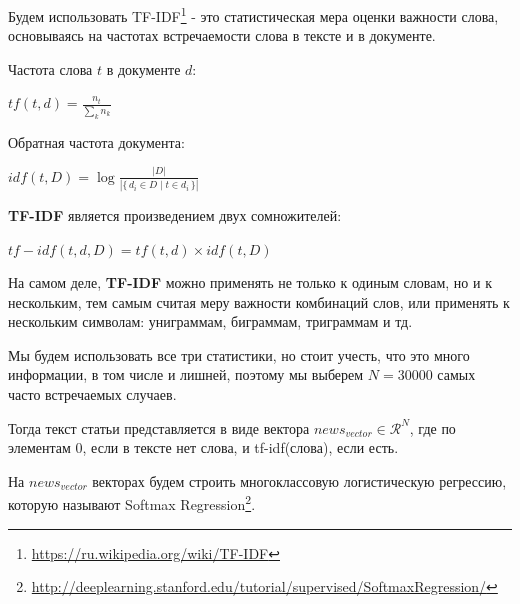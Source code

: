 \documentclass[12pt]{article}
\begin{document}
            
            Будем использовать TF-IDF\footnote{\href{https://ru.wikipedia.org/wiki/TF-IDF}{https://ru.wikipedia.org/wiki/TF-IDF}}
            - это статистическая мера оценки важности слова, основываясь на частотах встречаемости слова в тексте и в документе.

            Частота слова $t$ в документе $d$: 
            \begin{center}
                ${{tf} (t,d)={\frac {n_{t}}{\sum _{k}n_{k}}}}$
            \end{center}
            
            Обратная частота документа:
            \begin{center}
                ${idf} (t,D)=\log {\frac {|D|}{|\{\,d_{i}\in D\mid t\in d_{i}\,\}|}}$
            \end{center}

            \textbf{TF-IDF} является произведением двух сомножителей: 
            \begin{center}
                ${tf-idf}(t,d,D) = {tf}(t,d)\times {idf}(t,D)$
            \end{center}

            На самом деле, \textbf{TF-IDF} можно применять не только к одиным словам, но и к нескольким, тем
            самым считая меру важности комбинаций слов, или применять к нескольким символам:
            униграммам, биграммам, триграммам и тд. 

            Мы будем использовать все три статистики, но стоит учесть, что это много информации, в том числе и лишней,
            поэтому мы выберем $N = 30000$ самых часто встречаемых случаев. 

            Тогда текст статьи представляется в виде вектора $news_{vector} \in \mathcal{R}^N$, где по элементам 0, 
            если в тексте нет слова, и tf-idf(слова), если есть.

            На $news_{vector}$ векторах будем строить многоклассовую логистическую регрессию,
            которую называют Softmax Regression\footnote{\href{http://deeplearning.stanford.edu/tutorial/supervised/SoftmaxRegression/}{http://deeplearning.stanford.edu/tutorial/supervised/SoftmaxRegression/}}.
\end{document}
